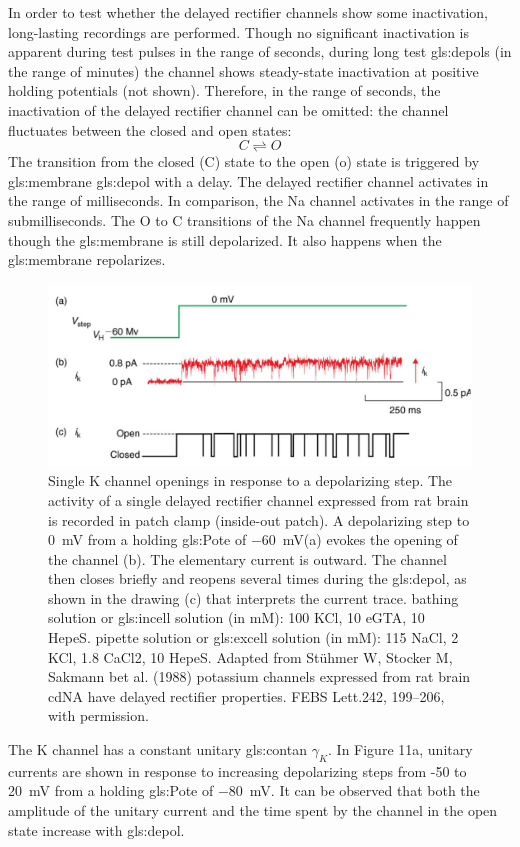 \documentclass[class={myRUCProject}, crop=false]{standalone}
\begin{document}
In order to test whether the delayed rectifier channels show some inactivation, long-lasting recordings are performed. Though no significant inactivation is apparent during test pulses in the range of seconds, during long test \glspl{gls:depol} (in the range of minutes) the channel shows steady-state inactivation at positive holding potentials (not shown). Therefore, in the range of seconds, the inactivation of the delayed rectifier channel can be omitted: the channel fluctuates between the closed and open states:
\[C\rightleftharpoons O\]
The transition from the closed (C) state to the open (o) state is triggered by \gls{gls:membrane} \gls{gls:depol} with a delay. The delayed rectifier channel activates in the range of milliseconds. In comparison, the \gls{Na} channel activates in the range of submilliseconds. The O to C transitions of the \gls{Na} channel frequently happen though the \gls{gls:membrane} is still depolarized. It also happens when the \gls{gls:membrane} repolarizes. 
 \begin{figure}[H]
   \centering
   \includegraphics[width=0.5\linewidth]{Pictures//Anakin/Kchannel.png}
   \caption{Single \gls{K} channel openings in response to a depolarizing step. The activity of a single delayed rectifier channel expressed from rat brain is recorded in patch clamp (inside-out patch). A depolarizing step to \qty{0}{\mV} from a holding \gls{gls:Pote} of \qty{-60}{\mV}(a) evokes the opening of the channel (b). The elementary current is outward. The channel then closes briefly and reopens several times during the \gls{gls:depol}, as shown in the drawing (c) that interprets the current trace. bathing solution or \gls{gls:incell} solution (in mM): 100 KCl, 10 eGTA, 10 HepeS. pipette solution or \gls{gls:excell} solution (in mM): 115 NaCl, 2 KCl, 1.8 CaCl2, 10 HepeS. Adapted from Stühmer W, Stocker M, Sakmann bet al. (1988) potassium channels expressed from rat brain cdNA have delayed rectifier properties. FEBS Lett.242, 199–206, with permission. }
   \label{fig:Kchannel}
 \end{figure}

The \gls{K} channel has a constant unitary \gls{gls:contan} \(\gamma_K\). In Figure 11a, unitary currents are shown in response to increasing depolarizing steps from -50 to \qty{20}{\mV} from a holding \gls{gls:Pote} of \qty{-80}{\mV}. It can be observed that both the amplitude of the unitary current and the time spent by the channel in the open state increase with \gls{gls:depol}. 
\end{document}
